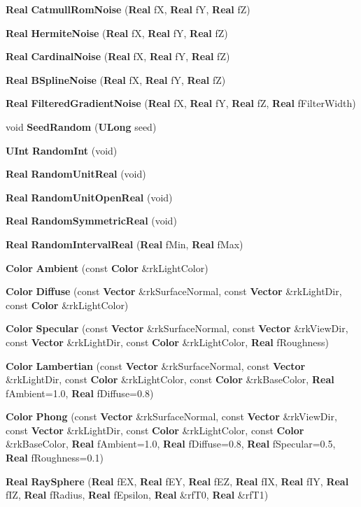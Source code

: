 \begin{CompactItemize}
{\bf Real} {\bf Catmull\-Rom\-Noise} ({\bf Real} f\-X, {\bf Real} f\-Y, {\bf Real} f\-Z)
\item 
{\bf Real} {\bf Hermite\-Noise} ({\bf Real} f\-X, {\bf Real} f\-Y, {\bf Real} f\-Z)
\item 
{\bf Real} {\bf Cardinal\-Noise} ({\bf Real} f\-X, {\bf Real} f\-Y, {\bf Real} f\-Z)
\item 
{\bf Real} {\bf BSpline\-Noise} ({\bf Real} f\-X, {\bf Real} f\-Y, {\bf Real} f\-Z)
\item 
{\bf Real} {\bf Filtered\-Gradient\-Noise} ({\bf Real} f\-X, {\bf Real} f\-Y, {\bf Real} f\-Z, {\bf Real} f\-Filter\-Width)
\item 
void {\bf Seed\-Random} ({\bf ULong} seed)
\item 
{\bf UInt} {\bf Random\-Int} (void)
\item 
{\bf Real} {\bf Random\-Unit\-Real} (void)
\item 
{\bf Real} {\bf Random\-Unit\-Open\-Real} (void)
\item 
{\bf Real} {\bf Random\-Symmetric\-Real} (void)
\item 
{\bf Real} {\bf Random\-Interval\-Real} ({\bf Real} f\-Min, {\bf Real} f\-Max)
\item 
{\bf Color} {\bf Ambient} (const {\bf Color} \&rk\-Light\-Color)
\item 
{\bf Color} {\bf Diffuse} (const {\bf Vector} \&rk\-Surface\-Normal, const {\bf Vector} \&rk\-Light\-Dir, const {\bf Color} \&rk\-Light\-Color)
\item 
{\bf Color} {\bf Specular} (const {\bf Vector} \&rk\-Surface\-Normal, const {\bf Vector} \&rk\-View\-Dir, const {\bf Vector} \&rk\-Light\-Dir, const {\bf Color} \&rk\-Light\-Color, {\bf Real} f\-Roughness)
\item 
{\bf Color} {\bf Lambertian} (const {\bf Vector} \&rk\-Surface\-Normal, const {\bf Vector} \&rk\-Light\-Dir, const {\bf Color} \&rk\-Light\-Color, const {\bf Color} \&rk\-Base\-Color, {\bf Real} f\-Ambient=1.0, {\bf Real} f\-Diffuse=0.8)
\item 
{\bf Color} {\bf Phong} (const {\bf Vector} \&rk\-Surface\-Normal, const {\bf Vector} \&rk\-View\-Dir, const {\bf Vector} \&rk\-Light\-Dir, const {\bf Color} \&rk\-Light\-Color, const {\bf Color} \&rk\-Base\-Color, {\bf Real} f\-Ambient=1.0, {\bf Real} f\-Diffuse=0.8, {\bf Real} f\-Specular=0.5, {\bf Real} f\-Roughness=0.1)
\item 
{\bf Real} {\bf Ray\-Sphere} ({\bf Real} f\-EX, {\bf Real} f\-EY, {\bf Real} f\-EZ, {\bf Real} f\-IX, {\bf Real} f\-IY, {\bf Real} f\-IZ, {\bf Real} f\-Radius, {\bf Real} f\-Epsilon, {\bf Real} \&rf\-T0, {\bf Real} \&rf\-T1)

\end{CompactItemize}
